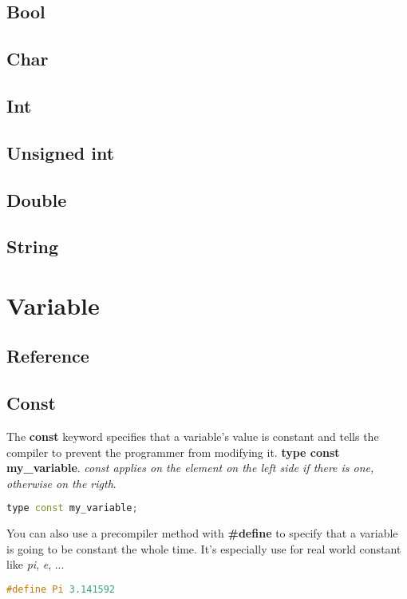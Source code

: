 \documentclass[a4paper, 12pt, titlepage]{scrartcl} %
\begin{document}
\subsection{Bool}
\subsection{Char}
\subsection{Int}
\subsection{Unsigned int}
\subsection{Double}
\subsection{String}

\newpage
\section{Variable}

\subsection{Reference}

\subsection{Const}
The \textbf{const} keyword specifies that a variable's value is constant and tells the compiler to prevent the programmer from modifying it. \textbf{type const my\_variable}. \textit{const applies on the element on the left side if there is one, otherwise on the rigth}.

\begin{lstlisting}[language=C++]
type const my_variable;
\end{lstlisting} \vspace{5mm}

You can also use a precompiler method with \textbf{\#define} to specify that a variable is going to be constant the whole time. It's especially use for real world constant like \textit{pi}, \textit{e}, ...

\begin{lstlisting}[language=C++]
#define Pi 3.141592
\end{lstlisting} \vspace{5mm}
\end{document}
